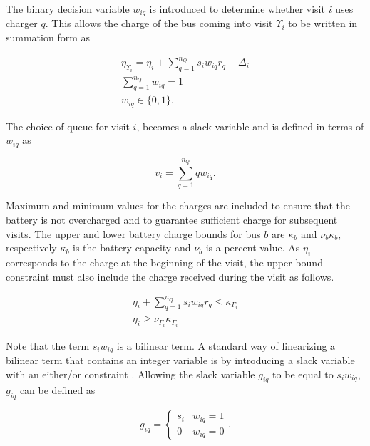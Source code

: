 \documentclass[utf8]{FrontiersinHarvard}
\let\cite\citep                                       %
\begin{document}
The binary decision variable \(w_{iq}\) is introduced to determine whether visit \(i\) uses charger \(q\). This allows the
charge of the bus coming into visit \(\Upsilon_i\) to be written in summation form as

\begin{subequations}
    \label{subeq:pre_next_charge}
\begin{align}
    \eta_{\Upsilon_i} = \eta_i + \sum_{q=1}^{n_Q} s_i w_{iq} r_q - \Delta_i \\
    \sum_{q=1}^{n_Q} w_{iq} = 1                           \\
    w_{iq} \in \{0,1\}.
\end{align}
\end{subequations}

The choice of queue for visit \(i\), becomes a slack variable and is defined in terms of \(w_{iq}\) as

\begin{equation}
    v_i = \sum_{q=1}^{n_Q} qw_{iq}.
\end{equation}

Maximum and minimum values for the charges are included to ensure that the battery is not overcharged and to guarantee
sufficient charge for subsequent visits. The upper and lower battery charge bounds for bus \(b\) are \(\kappa_b\) and \(\nu_b \kappa_b\),
respectively \(\kappa_b\) is the battery capacity and \(\nu_b\) is a percent value. As \(\eta_i\) corresponds to the charge at the
beginning of the visit, the upper bound constraint must also include the charge received during the visit as follows.

\begin{subequations}
    \label{subeq:pre_min_max}
\begin{align}
    \eta_i + \sum_{q=1}^{n_Q} s_i w_{iq} r_q \leq \kappa_{\Gamma_i} \\
    \eta_i \geq \nu_{\Gamma_i} \kappa_{\Gamma_i}
\end{align}
\end{subequations}

Note that the term \(s_i w_{iq}\) is a bilinear term. A standard way of linearizing a bilinear term that contains an
integer variable is by introducing a slack variable with an either/or constraint
\cite{chen-2010-applied,rodriguez-2013-compar-asses}. Allowing the slack variable \(g_{iq}\) to be equal to \(s_i w_{iq}\),
\(g_{iq}\) can be defined as

\begin{equation}
    \label{eq:giq_cases}
    g_{iq} =
    \begin{cases}
        s_i & w_{iq} = 1 \\
        0 & w_{iq} = 0
    \end{cases}.
\end{equation}
\end{document}
